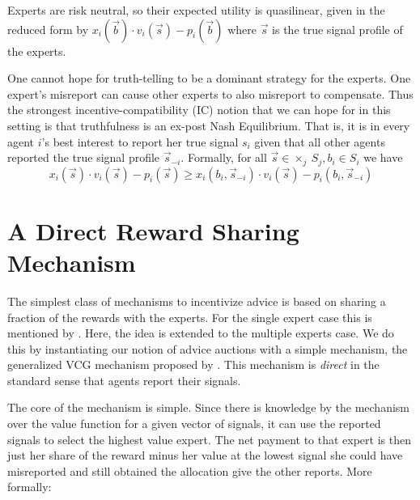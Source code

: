 Experts are risk neutral, so their expected utility is quasilinear, given in the reduced form by $x_i (\vec{b}) \cdot v_i(\vec{s}) - p_i(\vec{b})$ where $\vec{s}$ is the true signal profile of the experts.


One cannot hope for truth-telling to be a dominant strategy for the experts. One expert's misreport can cause other experts to also misreport to compensate. Thus the strongest incentive-compatibility (IC) notion that we can hope for in this setting is that truthfulness is an ex-post Nash Equilibrium. That is, it is in every agent $i$'s best interest to report her true signal $s_i$ given that all other agents reported the true signal profile $\vec{s}_{-i}$. Formally, for all $\vec{s} \in \times _{j} \  S_j, b_i \in S_i$ we have
$$x_i(\vec{s}) \cdot v_i(\vec{s}) - p_i(\vec{s}) \geq x_i(b_i, \vec{s}_{-i}) \cdot v_i(\vec{s}) - p_i(b_i, \vec{s}_{-i})$$





\section{A Direct Reward Sharing Mechanism}

The simplest class of mechanisms to incentivize advice is based on sharing a fraction of the rewards with the experts. For the single expert case this is mentioned by \citep{othman2010decision}. Here, the idea is extended to the multiple experts case. We do this by instantiating our notion of advice auctions with a simple mechanism,
the generalized VCG mechanism proposed by \citep{maskin1992auctions}. This mechanism is \emph{direct} in the standard sense that agents report their signals. 

The core of the mechanism is simple. Since there is knowledge by the mechanism over the value function for a given vector of signals, it can use the reported signals to select the highest value expert. The net payment to that expert is then just her share of the reward minus her value at the lowest signal she could have misreported and still obtained the allocation give the other reports. More formally:

